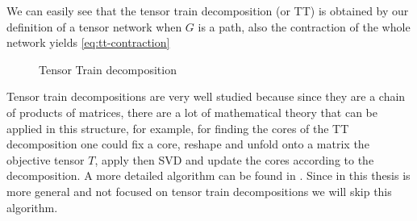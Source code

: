 \documentclass[11pt,a4paper,openright,oneside]{book}
\numberwithin{equation}{section}
\newcommand{\refeq}[1]{\cref{#1}}
\begin{document}
{We can easily see that the tensor train decomposition (or TT) is obtained by our definition of a tensor network when $G$ is a path, also
the contraction of the whole network yields \refeq{eq:tt-contraction}

\begin{figure}[h]
    \centering
   \begin{minipage}{0.3\textwidth}
\end{minipage}
\hfill
\begin{minipage}{0.15\textwidth}
\end{minipage}
\begin{minipage}{0.25\textwidth}
\end{minipage}

    \caption{Tensor Train decomposition}
    \label{tt:scheme}
\end{figure}

Tensor train decompositions are very well studied because since they are a chain of products of matrices, there are a lot
of mathematical theory that can be applied in this structure, for example, for finding the cores of the TT decomposition
one could fix a core, reshape and unfold onto a matrix the objective tensor $T$, apply then SVD and update the cores according to
the decomposition. A more detailed algorithm can be found in \cite{rohrig-zollnerPerformanceLowrankTensortrain2022}. Since in this thesis
is more general and not focused on tensor train decompositions we will skip this algorithm.

}
\end{document}
